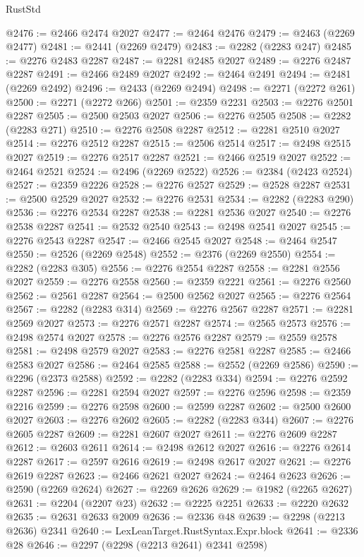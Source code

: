 \begin{lexlean}{RustStd}
\begin{coremodule}
@2476 := @2466 @2474 @2027
@2477 := @2464 @2476
@2479 := @2463 (@2269 @2477)
@2481 := @2441 (@2269 @2479)
@2483 := @2282 (@2283 @247)
@2485 := @2276 @2483 @2287
@2487 := @2281 @2485 @2027
@2489 := @2276 @2487 @2287
@2491 := @2466 @2489 @2027
@2492 := @2464 @2491
@2494 := @2481 (@2269 @2492)
@2496 := @2433 (@2269 @2494)
@2498 := @2271 (@2272 @261)
@2500 := @2271 (@2272 @266)
@2501 := @2359 @2231
@2503 := @2276 @2501 @2287
@2505 := @2500 @2503 @2027
@2506 := @2276 @2505
@2508 := @2282 (@2283 @271)
@2510 := @2276 @2508 @2287
@2512 := @2281 @2510 @2027
@2514 := @2276 @2512 @2287
@2515 := @2506 @2514
@2517 := @2498 @2515 @2027
@2519 := @2276 @2517 @2287
@2521 := @2466 @2519 @2027
@2522 := @2464 @2521
@2524 := @2496 (@2269 @2522)
@2526 := @2384 (@2423 @2524)
@2527 := @2359 @2226
@2528 := @2276 @2527
@2529 := @2528 @2287
@2531 := @2500 @2529 @2027
@2532 := @2276 @2531
@2534 := @2282 (@2283 @290)
@2536 := @2276 @2534 @2287
@2538 := @2281 @2536 @2027
@2540 := @2276 @2538 @2287
@2541 := @2532 @2540
@2543 := @2498 @2541 @2027
@2545 := @2276 @2543 @2287
@2547 := @2466 @2545 @2027
@2548 := @2464 @2547
@2550 := @2526 (@2269 @2548)
@2552 := @2376 (@2269 @2550)
@2554 := @2282 (@2283 @305)
@2556 := @2276 @2554 @2287
@2558 := @2281 @2556 @2027
@2559 := @2276 @2558
@2560 := @2359 @2221
@2561 := @2276 @2560
@2562 := @2561 @2287
@2564 := @2500 @2562 @2027
@2565 := @2276 @2564
@2567 := @2282 (@2283 @314)
@2569 := @2276 @2567 @2287
@2571 := @2281 @2569 @2027
@2573 := @2276 @2571 @2287
@2574 := @2565 @2573
@2576 := @2498 @2574 @2027
@2578 := @2276 @2576 @2287
@2579 := @2559 @2578
@2581 := @2498 @2579 @2027
@2583 := @2276 @2581 @2287
@2585 := @2466 @2583 @2027
@2586 := @2464 @2585
@2588 := @2552 (@2269 @2586)
@2590 := @2296 (@2373 @2588)
@2592 := @2282 (@2283 @334)
@2594 := @2276 @2592 @2287
@2596 := @2281 @2594 @2027
@2597 := @2276 @2596
@2598 := @2359 @2216
@2599 := @2276 @2598
@2600 := @2599 @2287
@2602 := @2500 @2600 @2027
@2603 := @2276 @2602
@2605 := @2282 (@2283 @344)
@2607 := @2276 @2605 @2287
@2609 := @2281 @2607 @2027
@2611 := @2276 @2609 @2287
@2612 := @2603 @2611
@2614 := @2498 @2612 @2027
@2616 := @2276 @2614 @2287
@2617 := @2597 @2616
@2619 := @2498 @2617 @2027
@2621 := @2276 @2619 @2287
@2623 := @2466 @2621 @2027
@2624 := @2464 @2623
@2626 := @2590 (@2269 @2624)
@2627 := @2269 @2626
@2629 := @1982 (@2265 @2627)
@2631 := @2204 (@2207 @23)
@2632 := @2225 @2251
@2633 := @2220 @2632
@2635 := @2631 @2633 @2009
@2636 := @2336 @48
@2639 := @2298 (@2213 @2636) @2341
@2640 := LexLeanTarget.RustSyntax.Expr.block
@2641 := @2336 @28
@2646 := @2297 (@2298 (@2213 @2641) @2341 @2598)

\end{coremodule}
\end{lexlean}
